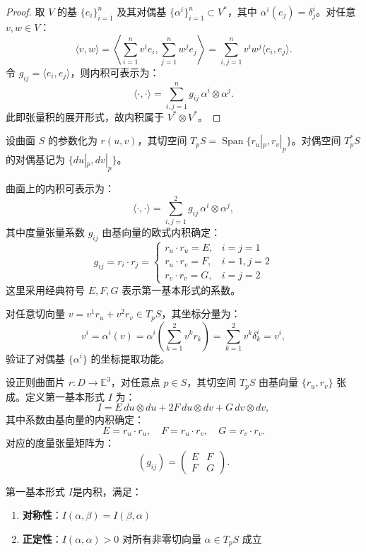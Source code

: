 \documentclass[lang=cn,10pt,thmcnt=section]{elegantbook}
\begin{document}
    \begin{proof}
    取 $V$ 的基 $\{e_i\}_{i=1}^n$ 及其对偶基 $\{\alpha^i\}_{i=1}^n \subset V^*$，其中 $\alpha^i(e_j) = \delta^i_j$。对任意 $v,w \in V$：
    \[
    \langle v, w \rangle = \left\langle \sum_{i=1}^n v^i e_i, \sum_{j=1}^n w^j e_j \right\rangle = \sum_{i,j=1}^n v^i w^j \langle e_i, e_j \rangle.
    \]
    令 $g_{ij} = \langle e_i, e_j \rangle$，则内积可表示为：
    \[
    \langle \cdot, \cdot \rangle = \sum_{i,j=1}^n g_{ij}\, \alpha^i \otimes \alpha^j.
    \]
    此即张量积的展开形式，故内积属于 $V^* \otimes V^*$。
\end{proof}
设曲面 $S$ 的参数化为 $r(u,v)$，其切空间 $T_pS = \operatorname{Span}\{r_u|_p, r_v|_p\}$。对偶空间 $T_p^*S$ 的对偶基记为 $\{du|_p, dv|_p\}$。

曲面上的内积可表示为：
\[
\langle \cdot, \cdot \rangle = \sum_{i,j=1}^2 g_{ij}\, \alpha^i \otimes \alpha^j,
\]
其中度量张量系数 $g_{ij}$ 由基向量的欧式内积确定：
\[
g_{ij} = r_i \cdot r_j = 
\begin{cases}
    r_u \cdot r_u = E, & i=j=1 \\
    r_u \cdot r_v = F, & i=1,j=2 \\
    r_v \cdot r_v = G, & i=j=2
\end{cases}
\]
这里采用经典符号 $E,F,G$ 表示第一基本形式的系数。

对任意切向量 $v = v^1 r_u + v^2 r_v \in T_pS$，其坐标分量为：
\[
v^i = \alpha^i(v) = \alpha^i\left( \sum_{k=1}^2 v^k r_k \right) = \sum_{k=1}^2 v^k \delta^i_k = v^i,
\]
验证了对偶基 $\{\alpha^i\}$ 的坐标提取功能。
\begin{definition}[第一基本形式]
    设正则曲面片 \( r: D \to \mathbb{E}^3 \)，对任意点 \( p \in S \)，其切空间 \( T_pS \) 由基向量 \(\{r_u, r_v\}\) 张成。定义第一基本形式 \( I \) 为：
\[
I = E \, du \otimes du + 2F \, du \otimes dv + G \, dv \otimes dv,
\]
其中系数由基向量的内积确定：
\[
E = r_u \cdot r_u, \quad F = r_u \cdot r_v, \quad G = r_v \cdot r_v.
\]
对应的度量张量矩阵为：
\[
(g_{ij}) = \begin{pmatrix}
E & F \\
F & G
\end{pmatrix}.
\]
\end{definition}
\begin{proposition}
    第一基本形式 \( I \)是内积，满足：
    \begin{enumerate}
    \item \textbf{对称性}：\( I(\alpha, \beta) = I(\beta, \alpha) \)
    \item \textbf{正定性}：\( I(\alpha, \alpha) > 0 \) 对所有非零切向量 \(\alpha \in T_pS\) 成立
    \end{enumerate}
    \end{proposition}
    
\end{document}
